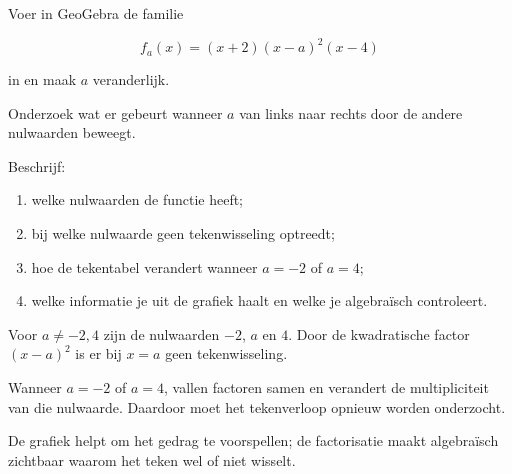 \documentclass{ximera}
\begin{document}
\begin{oefening}{\oefG}

Voer in GeoGebra de familie

\[
f_a(x)=(x+2)(x-a)^2(x-4)
\]

in en maak \(a\) veranderlijk.

Onderzoek wat er gebeurt wanneer \(a\) van links naar rechts door
de andere nulwaarden beweegt.

Beschrijf:
\begin{enumerate}
    \item welke nulwaarden de functie heeft;
    \item bij welke nulwaarde geen tekenwisseling optreedt;
    \item hoe de tekentabel verandert wanneer \(a=-2\) of \(a=4\);
    \item welke informatie je uit de grafiek haalt en welke je
          algebraïsch controleert.
\end{enumerate}

\begin{oplossing}
Voor \(a\neq -2,4\) zijn de nulwaarden \(-2\), \(a\) en \(4\).
Door de kwadratische factor \((x-a)^2\) is er bij \(x=a\)
geen tekenwisseling.

Wanneer \(a=-2\) of \(a=4\), vallen factoren samen en verandert
de multipliciteit van die nulwaarde. Daardoor moet het tekenverloop
opnieuw worden onderzocht.

De grafiek helpt om het gedrag te voorspellen; de factorisatie maakt
algebraïsch zichtbaar waarom het teken wel of niet wisselt.
\end{oplossing}

\end{oefening}
\end{document}
